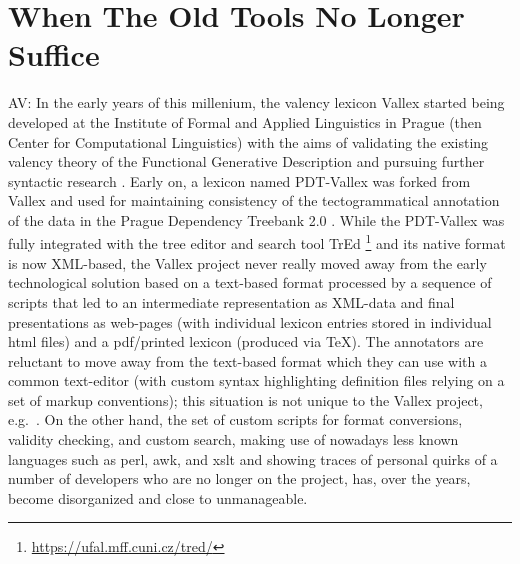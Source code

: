 \documentclass[10pt, a4paper]{article}
\newcommand{\av}[1]{{\color{ansa} AV: #1}}
\begin{document}
\section{When The Old Tools No Longer Suffice}
\av{
In the early years of this millenium,
the valency lexicon Vallex started being developed at the Institute of Formal and Applied Linguistics in Prague
(then Center for Computational Linguistics)
with the aims of
validating the existing valency theory of the Functional Generative Description and
pursuing further syntactic research
\cite{LopatkovaEtAl02tektogramaticky}.
Early on, a lexicon named PDT-Vallex was forked from Vallex and used for
maintaining consistency of the tectogrammatical annotation of the data in the
Prague Dependency Treebank 2.0 \cite{PDT2.0,HajicHonetschlager03annotation}.
While the PDT-Vallex was fully integrated with the tree editor and search tool TrEd%
\footnote{\url{https://ufal.mff.cuni.cz/tred/}}
\cite{PajasStepanek08recent}
and its native format is now XML-based,
the Vallex project never really moved away from the early technological solution based on a text-based format
processed by a sequence of scripts that led to an intermediate representation as XML-data
\cite{Zabokrtsky05valency}
and final presentations as web-pages (with individual lexicon entries stored in individual html files)
and a pdf/printed lexicon (produced via TeX).
The annotators are reluctant to move away from the text-based format which they can use with a common text-editor
(with custom syntax highlighting definition files relying on a set of markup conventions);
this situation is not unique to the Vallex project, e.g.\ \cite{Benko19LexiCorp}.
On the other hand, the set of custom scripts for format conversions,
validity checking, and custom search,
making use of nowadays less known languages
such as perl, awk, and xslt
and showing traces of personal quirks
of a number of developers who are no longer on the project,
has, over the years, become disorganized and close to unmanageable.
}
\end{document}
